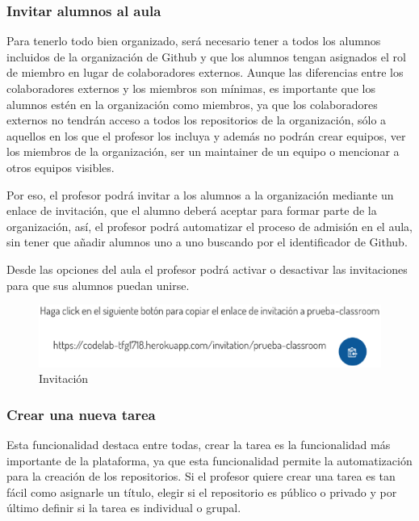 \newpage
\subsubsection{Invitar alumnos al aula}

Para tenerlo todo bien organizado, será necesario tener a todos los alumnos incluidos de la organización de Github y que los alumnos tengan asignados el rol de miembro en lugar de colaboradores externos. Aunque las diferencias entre los colaboradores externos y los miembros son mínimas, 
es importante que los alumnos estén en la organización como miembros, ya que los colaboradores externos no tendrán acceso a todos los repositorios de la organización, sólo a aquellos en los que el profesor los incluya y además no podrán crear equipos, 
ver los miembros de la organización, ser un maintainer de un equipo o mencionar a otros equipos visibles.

Por eso, el profesor podrá invitar a los alumnos a la organización mediante un enlace de invitación, que el alumno deberá aceptar para formar parte de la organización, así, el profesor podrá automatizar 
el proceso de admisión en el aula, sin tener que añadir alumnos uno a uno buscando por el identificador de Github.

Desde las opciones del aula el profesor podrá activar o desactivar las invitaciones para que sus alumnos puedan unirse.

\begin{figure}[!th]
\begin{center}
\includegraphics[scale=0.8]{images/invitacion}
\caption{Invitación}
\label{fig:Invitacion}
\end{center}
\end{figure}

\subsubsection{Crear una nueva tarea}

Esta funcionalidad destaca entre todas, crear la tarea es la funcionalidad más importante de la plataforma, ya que esta funcionalidad permite la automatización para la creación de los repositorios.
Si el profesor quiere crear una tarea es tan fácil como asignarle un título, elegir si el repositorio es público o privado y por último definir si la tarea es individual o grupal.

